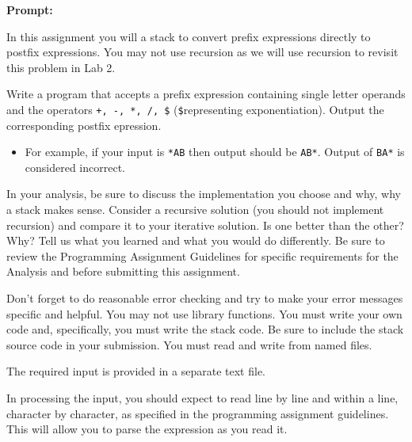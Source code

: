 \documentclass[10pt,letterpaper,final]{report}
\begin{document}
\begin{center}
  \vline
\end{center}

\noindent\textbf{Prompt:}

In this assignment you will a stack to convert prefix expressions directly to postfix expressions. You may not use recursion as we will use recursion to revisit this problem in Lab 2.


Write a program that accepts a prefix expression containing single letter operands and the operators \verb|+, -, *, /, $| (\verb|$|representing exponentiation). Output the corresponding postfix epression.

\begin{itemize}
  \item For example, if your input is \verb|*AB| then output should be \verb|AB*|. Output of \verb|BA*| is considered incorrect.
\end{itemize}

In your analysis, be sure to discuss the implementation you choose and why, why a stack makes sense. Consider a recursive solution (you should not implement recursion) and compare it to your iterative solution. Is one better than the other? Why? Tell us what you learned and what you would do differently. Be sure to review the Programming Assignment Guidelines for specific requirements for the Analysis and before submitting this assignment.

Don't forget to do reasonable error checking and try to make your error messages specific and helpful.  You may not use library functions. You must write your own code and, specifically, you must write the stack code. Be sure to include the stack source code in your submission. You must read and write from named files.

The required input is provided in a separate text file.

In processing the input, you should expect to read line by line and within a line, character by character, as specified in the programming assignment guidelines. This will allow you to parse the expression as you read it.
\end{document}
